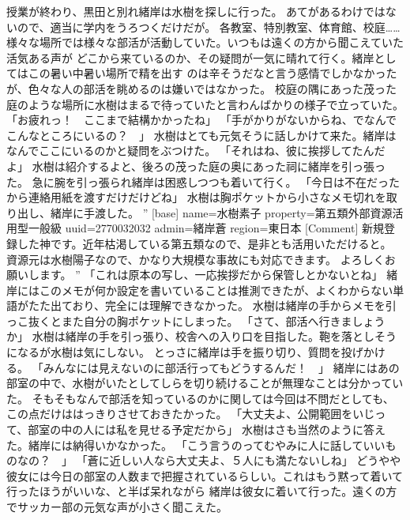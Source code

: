 \documentclass[uplatex]{utbook}
\begin{document}
授業が終わり、黒田と別れ緒岸は水樹を探しに行った。
あてがあるわけではないので、適当に学内をうろつくだけだが。
各教室、特別教室、体育館、校庭……
様々な場所では様々な部活が活動していた。いつもは遠くの方から聞こえていた活気ある声が
どこから来ているのか、その疑問が一気に晴れて行く。緒岸としてはこの暑い中暑い場所で精を出す
のは辛そうだなと言う感情でしかなかったが、色々な人の部活を眺めるのは嫌いではなかった。
校庭の隅にあった茂った庭のような場所に水樹はまるで待っていたと言わんばかりの様子で立っていた。
「お疲れっ！　ここまで結構かかったね」
「手がかりがないからね、でなんでこんなところにいるの？　」
水樹はとても元気そうに話しかけて来た。緒岸はなんでここにいるのかと疑問をぶつけた。
「それはね、彼に挨拶してたんだよ」
水樹は紹介するよと、後ろの茂った庭の奥にあった祠に緒岸を引っ張った。
急に腕を引っ張られ緒岸は困惑しつつも着いて行く。
「今日は不在だったから連絡用紙を渡すだけだけどね」
水樹は胸ポケットから小さなメモ切れを取り出し、緒岸に手渡した。
”
[base]
name=水樹素子
property=第五類外部資源活用型一般級
uuid=2770032032
admin=緒岸蒼
region=東日本
[Comment]
新規登録した神です。近年枯渇している第五類なので、是非とも活用いただけると。
資源元は水樹陽子なので、かなり大規模な事故にも対応できます。
よろしくお願いします。
”
「これは原本の写し、一応挨拶だから保管しとかないとね」
緒岸にはこのメモが何か設定を書いていることは推測できたが、よくわからない単語がたた出ており、完全には理解できなかった。
水樹は緒岸の手からメモを引っこ抜くとまた自分の胸ポケットにしまった。
「さて、部活へ行きましょうか」
水樹は緒岸の手を引っ張り、校舎への入り口を目指した。鞄を落としそうになるが水樹は気にしない。
とっさに緒岸は手を振り切り、質問を投げかける。
「みんなには見えないのに部活行ってもどうするんだ！　」
緒岸にはあの部室の中で、水樹がいたとしてしらを切り続けることが無理なことは分かっていた。
そもそもなんで部活を知っているのかに関しては今回は不問だとしても、この点だけははっきりさせておきたかった。
「大丈夫よ、公開範囲をいじって、部室の中の人には私を見せる予定だから」
水樹はさも当然のように答えた。緒岸には納得いかなかった。
「こう言うのってむやみに人に話していいものなの？　」
「蒼に近しい人なら大丈夫よ、５人にも満たないしね」
どうやや彼女には今日の部室の人数まで把握されているらしい。これはもう黙って着いて行ったほうがいいな、と半ば呆れながら
緒岸は彼女に着いて行った。遠くの方でサッカー部の元気な声が小さく聞こえた。
\end{document}
